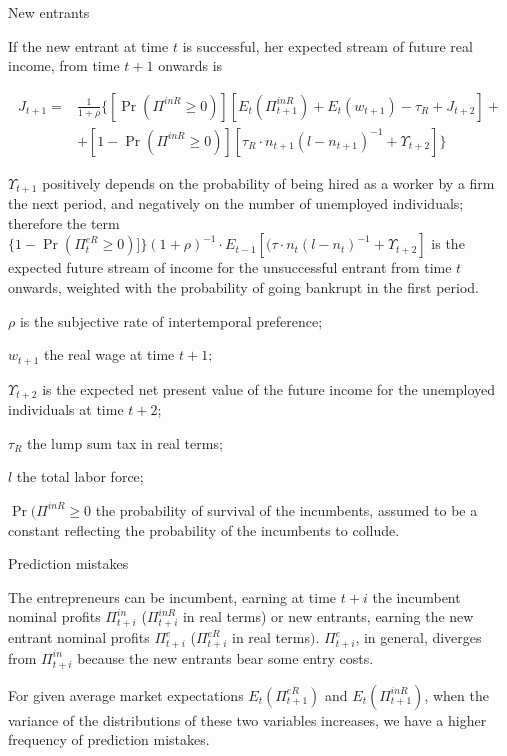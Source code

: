 \documentclass[9pt]{beamer}
\begin{document}
\begin{frame}{New entrants}

If the new entrant at time $t$ is successful, her expected stream of future
real income, from time $t+1$ onwards is

\begin{equation}
\begin{aligned}
J_{t+1} = & \frac{1}{1+\rho }\{[\Pr (\Pi ^{inR}\geq 0)][E_{t}(\Pi
_{t+1}^{inR})+E_{t}(w_{t+1})-\tau _{R}+J_{t+2}]+ \\
& +[1-\Pr (\Pi ^{inR} \geq 0)][\tau _{R}\cdot n_{t+1}\left( l-n_{t+1}\right)
^{-1}+\Upsilon _{t+2}]\}
\end{aligned}
\end{equation}

$\Upsilon _{t+1}$ positively depends on the probability of being hired as
a worker by a firm the next period, and negatively on the number of
unemployed individuals; therefore the term $\{1-\Pr (\Pi _{t}^{eR}\geq
0)]\}(1+\rho )^{-1}\cdot E_{t-1}[(\tau \cdot n_{t}\left( l-n_{t}\right)
^{-1}+\Upsilon _{t+2}]$ is the expected future stream of income for the
unsuccessful entrant from time $t$ onwards, weighted with the probability of
going bankrupt in the first period.

\bigskip
\footnotesize
$\rho$ is the subjective rate of intertemporal preference;

$w_{t+1}$ the real wage at time $t+1$;

$\Upsilon _{t+2}$ is the expected net present value of the future income for the unemployed individuals at time $t+2$;

$\tau _{R}$ the lump sum tax in real terms; 
 
 $l$ the total labor force; 
 
 $\Pr (\Pi ^{inR}\geq 0$ the probability of survival of the incumbents, assumed to be a constant reflecting the probability of the incumbents to collude.


\end{frame}

\begin{frame}{Prediction mistakes}


The entrepreneurs can be incumbent, earning at time $t+i$ the incumbent
nominal profits $\Pi _{t+i}^{in}$ ($\Pi _{t+i}^{inR}$ in real terms) or new
entrants, earning the new entrant nominal profits $\Pi _{t+i}^{e}$ ($\Pi
_{t+i}^{eR}$ in real terms$).$ $\Pi _{t+i}^{e}$, in general, diverges from $%
\Pi _{t+i}^{in}$ because the new entrants bear some entry costs.

\bigskip
\bigskip

For given average market expectations $E_{t}(\Pi _{t+1}^{eR})$ and $%
E_{t}(\Pi _{t+1}^{inR})$, when the variance of the distributions of these
two variables increases, we have a higher frequency of prediction mistakes.

\bigskip


\end{frame}
\end{document}

